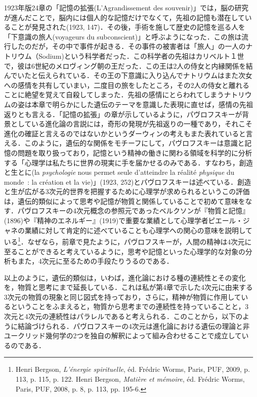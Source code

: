 1923年版24章の「記憶の拡張(L’Agrandissement des souvenir)」では，脳の研究が進んだことで，脳内には個人的な記憶だけでなくて，先祖の記憶も潜在していることが発見された(1923, 147)．その後，手術を施して歴史の記憶を巡る人を「下意識の旅人(voyageurs du subconscient)」と呼ぶようになった．この旅は流行したのだが，その中で事件が起きる．その事件の被害者は「旅人」の一人のナトリウム（Sodium)という科学者だった．この科学者の先祖はカリベルト１世で，彼は6世紀のメロヴィング朝の王だった．この王は2人の侍女と内縁関係を結んでいたと伝えられている．その王の下意識に入り込んでナトリウムはまた次女への感情を共有していまい，二度目の旅をしたところ，その2人の侍女と離れることに絶望を覚えて自殺してしまった．先祖の感情にとらわれてしまうナトリウムの姿は本章で明らかにした遺伝のテーマを意識した表現に直せば，感情の先祖返りとも言える．「記憶の拡張」の章が示しているように，パヴロフスキーが背景としている進化論の言説には，奇形の発現が先祖返りの一種であり，それこそ進化の確証と言えるのではないかというダーウィンの考えもまた表れていると言える．このように，遺伝的な関係をモチーフにして，パヴロフスキーは意識と記憶の問題を取り扱っており，記憶という精神の働きに関わる領域を科学的に分析する「心理学は私たちに世界の現実に手を届かせるのみである．すなわち，創造と生とに(la \emph{psychologie} nous permet seule d'atteindre la réalité \emph{physique} du monde~: la création et la vie)」(1923, 252)とパヴロフスキーは述べている．創造と生が広がる3次元的世界を把握するために心理学が求められるというこの評価は，遺伝的類似によって思考や記憶が物質と関係していることで初めて意味をなす．パヴロフスキーの4次元概念の参照元であったベルクソンが『物質と記憶』(1896)や『精神のエネルギー』(1919)で重要な業績として心理学者ピエール・ジャネの業績に対して肯定的に述べていることも心理学への関心の意味を説明している\footnote{Henri Bergson, \emph{L'énergie spirituelle}, éd. Frédric Worms, Paris, PUF, 2009, p. 113, p. 115, p. 122. Henri Bergson, \emph{Matière et mémoire}, éd. Frédric Worms, Paris, PUF, 2008, p. 8, p. 113, pp. 195-6. }．なぜなら，前章で見たように，パヴロフスキーが，人間の精神は4次元に至ることができると考えているように，思考や記憶といった心理学的な対象の分析もまた，4次元に至るための手段たりうるのである．

以上のように，遺伝的類似は，いわば，進化論における種の連続性とその変化を，物質と思考にまで延長している．これは私が第4章で示した4次元に由来する3次元の物質の現象と同じ図式を持っており，さらに，精神が物質に作用しているということをふまえると，物質から思考までの連続性を持っていることと，3次元と4次元の連続性はパラレルであると考えられる．このことから，以下のように結論づけられる．パヴロフスキーの4次元は進化論における遺伝の理論と非ユークリッド幾何学の2つを独自の解釈によって組み合わせることで成立しているのである．
